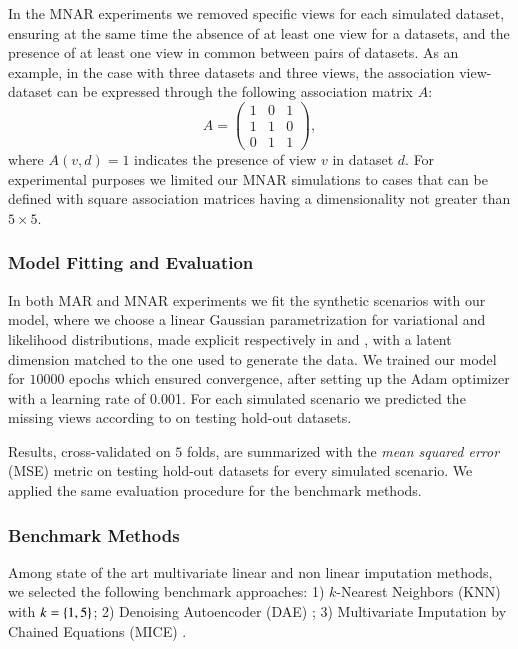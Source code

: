 In the MNAR experiments we removed specific views for each simulated dataset, ensuring at the same time the absence of at least one view for a datasets, and the presence of at least one view in common between pairs of datasets.
As an example, in the case with three datasets and three views, the association view-dataset can be expressed through the following association matrix $A$:
\begin{equation}
A = 
\begin{pmatrix}
1 & 0 & 1 \\
1 & 1 & 0 \\
0 & 1 & 1 
\end{pmatrix},
\end{equation}
where $A(v,d)=1$ indicates the presence of view $v$ in dataset $d$.
For experimental purposes we limited our MNAR simulations to cases that can be defined with square association matrices having a dimensionality not greater than $5\times5$.

\subsubsection{Model Fitting and Evaluation}
In both MAR and MNAR experiments we fit the synthetic scenarios with our model, where we choose a linear Gaussian parametrization for variational and likelihood distributions, made explicit respectively in  and , with a latent dimension matched to the one used to generate the data.
We trained our model for $10000$ epochs which ensured convergence, after setting up the Adam optimizer with a learning rate of 0.001.
For each simulated scenario we predicted the missing views according to  on testing hold-out datasets.

Results, cross-validated on $5$ folds, are summarized with the \textit{mean squared error} (MSE) metric on testing hold-out datasets for every simulated scenario.
We applied the same evaluation procedure for the benchmark methods.

\subsubsection{Benchmark Methods}
Among state of the art multivariate linear and non linear imputation methods, we selected the following benchmark approaches:
1) $k$-Nearest Neighbors (KNN) with $k=\left\{1, 5\right\}$;
2) Denoising Autoencoder (DAE) \citep{dae};
3) Multivariate Imputation by Chained Equations (MICE) \citep{Vanbuuren2000}.

